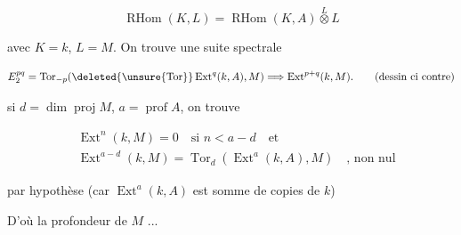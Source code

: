 \[
\operatorname{RHom}(K,L)=\operatorname{RHom}(K,A)\overset{L}{\otimes}L
\]

avec $K=k$, $L=M$. On trouve une suite spectrale

\[
E_2^{pq}=\operatorname{Tor}_{-p}(\deleted{\unsure{\operatorname{Tor}}}\operatorname{Ext}^{q}(k,A),M)\Longrightarrow \operatorname{Ext}^{p+q}(k,M).\qquad \text{(dessin ci contre)}
\]


si $d=\dim\operatorname{proj}M$, $a=\operatorname{prof}A$, on trouve

\[
\begin{aligned}
&\operatorname{Ext}^{n}(k,M)=0\quad\text{si }n<a-d\quad\text{et}\\
&\operatorname{Ext}^{a-d}(k,M)=\operatorname{Tor}_d(\operatorname{Ext}^a(k,A),M)\quad\text{, non nul}
\end{aligned}
\]

par hypothèse (car $\operatorname{Ext}^a(k,A)$ est somme de copies de $k$)

D'où la profondeur de $M$ ...
